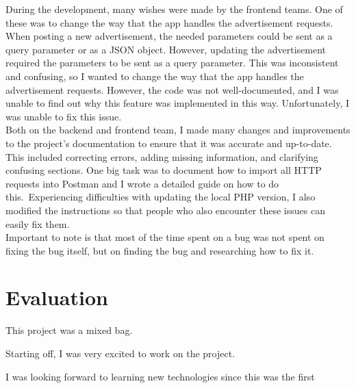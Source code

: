 \documentclass[sf-font,usefira,english]{uulm/sp/article}
\begin{document}
During the development, many wishes were made by the frontend teams.
One of these was to change the way that the app handles the advertisement
requests.
When posting a new advertisement, the needed parameters could be sent
as a query parameter or as a JSON object. 
However, updating the advertisement required the parameters to be sent
as a query parameter.
This was inconsistent and confusing, so I wanted to change the way that the app
handles the advertisement requests.
However, the code was not well-documented, and I was unable to find
out why this feature was implemented in this way.
Unfortunately, I was unable to fix this issue.\\

Both on the backend and frontend team,
I made many changes and improvements to the project's 
documentation to ensure that it was accurate and up-to-date. 
This included correcting errors, adding missing information, and clarifying confusing sections.
One big task was to document how to import all HTTP requests into Postman
and I wrote a detailed guide on how to do this.\
Experiencing difficulties with updating the local PHP version,
I also modified the instructions so that people who also encounter
these issues can easily fix them.\\

Important to note is that most of the time spent on a bug
was not spent on fixing the bug itself, but on finding the bug
and researching how to fix it.\\

\section{Evaluation} %

This project was a mixed bag.

Starting off, I was very excited to work on the project.

I was looking forward to learning new technologies since this was
the first 
\end{document}
